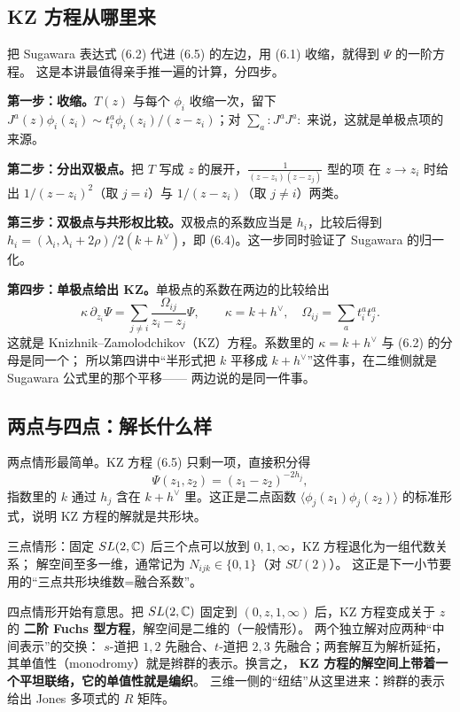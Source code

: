 \subsection{KZ 方程从哪里来}

把 Sugawara 表达式 (6.2) 代进 (6.5) 的左边，用 (6.1) 收缩，就得到 $\Psi$ 的一阶方程。
这是本讲最值得亲手推一遍的计算，分四步。

\textbf{第一步：收缩。}$T(z)$ 与每个 $\phi_i$ 收缩一次，留下 $J^a(z)\phi_i(z_i)\sim
t^a_i\phi_i(z_i)/(z-z_i)$；对 $\sum_a:J^aJ^a:$ 来说，这就是单极点项的来源。

\textbf{第二步：分出双极点。}把 $T$ 写成 $z$ 的展开，$\frac{1}{(z-z_i)(z-z_j)}$ 型的项
在 $z\to z_i$ 时给出 $1/(z-z_i)^2$（取 $j=i$）与 $1/(z-z_i)$（取 $j\ne i$）两类。

\textbf{第三步：双极点与共形权比较。}双极点的系数应当是 $h_i$，比较后得到
$h_i=(\lambda_i,\lambda_i+2\rho)/2(k+h^\vee)$，即 (6.4)。这一步同时验证了 Sugawara 的归一化。

\textbf{第四步：单极点给出 KZ。}单极点的系数在两边的比较给出
\begin{equation}
\kappa\,\partial_{z_i}\Psi=\sum_{j\ne i}\frac{\Omega_{ij}}{z_i-z_j}\Psi,
\qquad \kappa=k+h^\vee,\quad \Omega_{ij}=\sum_a t^a_i t^a_j . \tag{6.5}
\end{equation}
这就是 Knizhnik--Zamolodchikov（KZ）方程。系数里的 $\kappa=k+h^\vee$ 与 (6.2) 的分母是同一个；
所以第四讲中“半形式把 $k$ 平移成 $k+h^\vee$”这件事，在二维侧就是 Sugawara 公式里的那个平移——
两边说的是同一件事。

\subsection{两点与四点：解长什么样}

两点情形最简单。KZ 方程 (6.5) 只剩一项，直接积分得
\[
\Psi(z_1,z_2)=(z_1-z_2)^{-2h_j},
\]
指数里的 $k$ 通过 $h_j$ 含在 $k+h^\vee$ 里。这正是二点函数
$\langle\phi_j(z_1)\phi_j(z_2)\rangle$ 的标准形式，说明 KZ 方程的解就是共形块。

三点情形：固定 $SL(2,\mathbb{C})$ 后三个点可以放到 $0,1,\infty$，KZ 方程退化为一组代数关系；
解空间至多一维，通常记为 $N_{ijk}\in\{0,1\}$（对 $SU(2)$）。
这正是下一小节要用的“三点共形块维数=融合系数”。

四点情形开始有意思。把 $SL(2,\mathbb{C})$ 固定到 $(0,z,1,\infty)$ 后，KZ 方程变成关于 $z$ 的
\textbf{二阶 Fuchs 型方程}，解空间是二维的（一般情形）。
两个独立解对应两种“中间表示”的交换：
$s$-道把 $1,2$ 先融合、$t$-道把 $2,3$ 先融合；两套解互为解析延拓，
其单值性（monodromy）就是辫群的表示。换言之，
\textbf{KZ 方程的解空间上带着一个平坦联络，它的单值性就是编织}。
三维一侧的“纽结”从这里进来：辫群的表示给出 Jones 多项式的 $R$ 矩阵。

